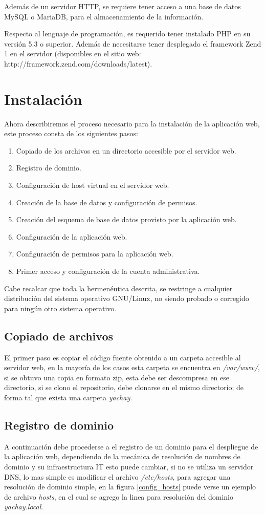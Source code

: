 Además de un servidor HTTP, se requiere tener acceso a una base de datos MySQL o
MariaDB, para el almacenamiento de la información.

Respecto al lenguaje de programación, es requerido tener instalado PHP en su
versión 5.3 o superior. Además de necesitarse tener desplegado el framework Zend
1 en el servidor (disponibles en el sitio web:
http://framework.zend.com/downloads/latest).

\section{Instalación}
Ahora describiremos el proceso necesario para la instalación de la aplicación
web, este proceso consta de los siguientes pasos:

\begin{enumerate}
\item Copiado de los archivos en un directorio accesible por el servidor web.
\item Registro de dominio.
\item Configuración de host virtual en el servidor web.
\item Creación de la base de datos y configuración de permisos.
\item Creación del esquema de base de datos provisto por la aplicación web.
\item Configuración de la aplicación web.
\item Configuración de permisos para la aplicación web.
\item Primer acceso y configuración de la cuenta administrativa.
\end{enumerate}

Cabe recalcar que toda la hermenéutica descrita, se restringe a cualquier
distribución del sistema operativo GNU/Linux, no siendo probado o corregido
para ningún otro sistema operativo.

\subsection{Copiado de archivos}
El primer paso es copiar el código fuente obtenido a un carpeta accesible al
servidor web, en la mayoría de los casos esta carpeta se encuentra en
\emph{/var/www/}, si se obtuvo una copia en formato zip, esta debe ser
descompresa en ese directorio, si se clono el repositorio, debe clonarse en el
mismo directorio; de forma tal que exista una carpeta \emph{yachay}.

\subsection{Registro de dominio}
A continuación debe procederse a el registro de un dominio para el despliegue de
la aplicación web, dependiendo de la mecánica de resolución de nombres de
dominio y su infraestructura IT esto puede cambiar, si no se utiliza un servidor
DNS, lo mas simple es modificar el archivo \emph{/etc/hosts}, para agregar una
resolución de dominio simple, en la figura \ref{config_hosts} puede verse un
ejemplo de archivo \emph{hosts}, en el cual se agrego la linea para resolución
del dominio \emph{yachay.local}.


